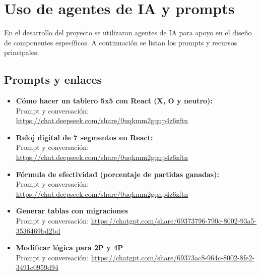 \documentclass[11pt,a4paper]{article}
\begin{document}
\section{Uso de agentes de IA y prompts}

En el desarrollo del proyecto se utilizaron agentes de IA para apoyo en el diseño de componentes específicos.
A continuación se listan los prompts y recursos principales:

\subsection{Prompts y enlaces}

\begin{itemize}
    \item \textbf{Cómo hacer un tablero 5x5 con React (X, O y neutro):}\\
    Prompt y conversación: \url{https://chat.deepseek.com/share/0uqkmm2gqnp4z6zftn}
    
    \item \textbf{Reloj digital de 7 segmentos en React:}\\
    Prompt y conversación: \url{https://chat.deepseek.com/share/0uqkmm2gqnp4z6zftn}
    
    \item \textbf{Fórmula de efectividad (porcentaje de partidas ganadas):}\\
    Prompt y conversación: \url{https://chat.deepseek.com/share/0uqkmm2gqnp4z6zftn}

    \item \textbf{Generar tablas con migraciones}\\
    Prompt y conversación: \url{https://chatgpt.com/share/69373796-790c-8002-93a5-3536469bd2bd}

    \item \textbf{Modificar lógica para 2P y 4P}\\
    Prompt y conversación: \url{https://chatgpt.com/share/69373ac8-964c-8002-8fe2-3491c0959d94}
\end{itemize}

\end{document}
